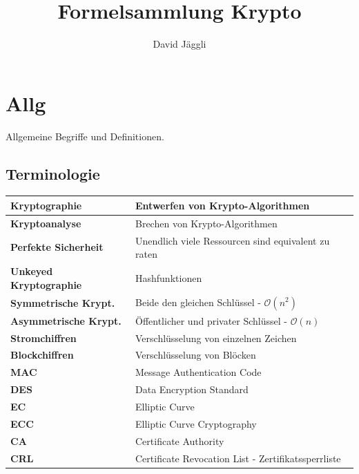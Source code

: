 \documentclass[12pt]{scrartcl}
\author{David Jäggli}
\title{Formelsammlung Krypto}
\begin{document}
\maketitle

\tableofcontents

\newpage
\section{Allg}

Allgemeine Begriffe und Definitionen.


\subsection{Terminologie}


\renewcommand{\arraystretch}{1.5}
\begin{center}
    \begin{tabular}{ | m{12em} | m{25em} | }
        \hline
        \textbf{Kryptographie}          & Entwerfen von Krypto-Algorithmen                          \\
        \hline
        \textbf{Kryptoanalyse}          & Brechen von Krypto-Algorithmen                            \\
        \hline
        \textbf{Perfekte Sicherheit}    & Unendlich viele Ressourcen sind equivalent zu raten       \\
        \hline
        \textbf{Unkeyed Kryptographie}  & Hashfunktionen                                            \\
        \hline
        \textbf{Symmetrische Krypt.}    & Beide den gleichen Schlüssel - $\mathcal{O}(n^2)$         \\
        \hline
        \textbf{Asymmetrische Krypt.}   & Öffentlicher und privater Schlüssel - $\mathcal{O}(n)$    \\
        \hline
        \textbf{Stromchiffren}          & Verschlüsselung von einzelnen Zeichen                     \\
        \hline
        \textbf{Blockchiffren}          & Verschlüsselung von Blöcken                               \\
        \hline
        \textbf{MAC}                    & Message Authentication Code                               \\
        \hline
        \textbf{DES}                    & Data Encryption Standard                                  \\
        \hline
        \textbf{EC}                     & Elliptic Curve                                            \\
        \hline
        \textbf{ECC}                    & Elliptic Curve Cryptography                               \\
        \hline
        \textbf{CA}                     & Certificate Authority                                     \\
        \hline
        \textbf{CRL}                     & Certificate Revocation List - Zertifikatssperrliste                                     \\
        \hline
    \end{tabular}
\end{center}
\end{document}
